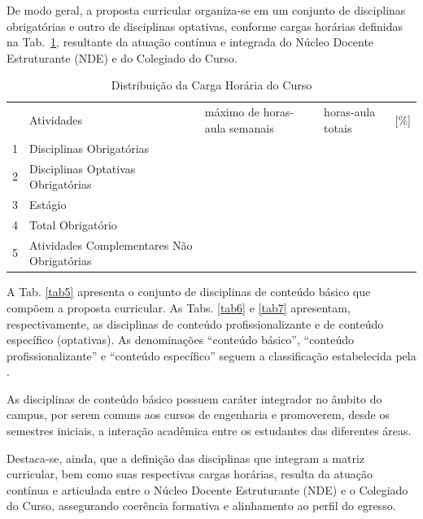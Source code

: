 De modo geral, a proposta curricular organiza-se em um conjunto de disciplinas obrigatórias e outro de disciplinas optativas, conforme cargas horárias definidas na Tab.~\ref{tab4}, resultante da atuação contínua e integrada do Núcleo Docente Estruturante (NDE) e do Colegiado do Curso.

\begin{longtable}{|p{0.3cm}|p{7.1cm}|p{2.7cm}|p{1.8cm}|p{1.0cm}|}
	\caption{Distribuição da Carga Horária do Curso}\label{tab4}
	
	\vspace{-0.25cm} \\
	\hline 
	\cellcolor{\cinza} & \cellcolor{\cinza}Atividades & \cellcolor{\cinza}máximo de horas-aula semanais & \cellcolor{\cinza}horas-aula totais & \cellcolor{\cinza}[\%] \\ 
	\hline
	1 &  Disciplinas Obrigatórias  &  \CHTOTALDOBSE  &  \CHTOTALDOB & \CHTOTALDOBPE \\ \hline
	2 &  Disciplinas Optativas Obrigatórias  &  \CHOPTMINSE  &  \CHOPTMIN & \CHOPTMINPE \\ \hline
	3 &  Estágio  &  \CHESTAGIOSE  &  \CHESTAGIO & \CHESTAGIOPE \\ \hline
	4 &  Total Obrigatório  &  \CHTOTALOBSE  &  \CHTOTALOB & \CHTOTALOBPE \\ \hline

	5 &  Atividades Complementares Não Obrigatórias &  \CHCOMPSE  &  \CHCOMP & \CHCOMPPE \\ \hline

\end{longtable}

A Tab. \ref{tab5} apresenta o conjunto de disciplinas de conteúdo básico que compõem a proposta curricular. As Tabs. \ref{tab6} e \ref{tab7} apresentam, respectivamente, as disciplinas de conteúdo profissionalizante e de conteúdo específico (optativas). As denominações “conteúdo básico”, “conteúdo profissionalizante” e “conteúdo específico” seguem a classificação estabelecida pela .

As disciplinas de conteúdo básico possuem caráter integrador no âmbito do campus, por serem comuns aos cursos de engenharia e promoverem, desde os semestres iniciais, a interação acadêmica entre os estudantes das diferentes áreas.

Destaca-se, ainda, que a definição das disciplinas que integram a matriz curricular, bem como suas respectivas cargas horárias, resulta da atuação contínua e articulada entre o Núcleo Docente Estruturante (NDE) e o Colegiado do Curso, assegurando coerência formativa e alinhamento ao perfil do egresso.


